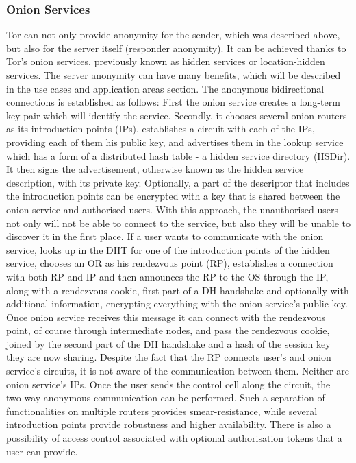 \subsubsection{Onion Services}
Tor can not only provide anonymity for the sender, which was described above, but also for the server itself (responder anonymity). It can be achieved thanks to Tor’s onion services, previously known as hidden services or location-hidden services. The server anonymity can have many benefits, which will be described in the use cases and application areas section.
The anonymous bidirectional connections is established as follows:
First the onion service creates a long-term key pair which will identify the service. Secondly, it chooses several onion routers as its introduction points (IPs), establishes a circuit with each of the IPs, providing each of them his public key, and advertises them in the lookup service which has a form of a distributed hash table - a hidden service directory (HSDir). It then signs the advertisement, otherwise known as the hidden service description, with its private key. Optionally, a part of the descriptor that includes the introduction points can be encrypted with a key that is shared between the onion service and authorised users. With this approach, the unauthorised users not only will not be able to connect to the service, but also they will be unable to discover it in the first place.
If a user wants to communicate with the onion service, looks up in the DHT for one of the introduction points of the hidden service, chooses an OR as his rendezvous point (RP), establishes a connection with both RP and IP and then announces the RP to the OS through the IP, along with a rendezvous cookie, first part of a DH handshake and optionally with additional information, encrypting everything with the onion service’s public key. Once onion service receives this message it can connect with the rendezvous point, of course through intermediate nodes, and pass the rendezvous cookie, joined by the second part of the DH handshake and a hash of the session key they are now sharing. Despite the fact that the RP connects user’s and onion service’s circuits, it is not aware of the communication between them. Neither are onion service’s IPs. Once the user sends the control cell along the circuit, the two-way anonymous communication can be performed.
Such a separation of functionalities on multiple routers provides smear-resistance, while several introduction points provide robustness and higher availability.
There is also a possibility of access control associated with optional authorisation tokens that a user can provide.
